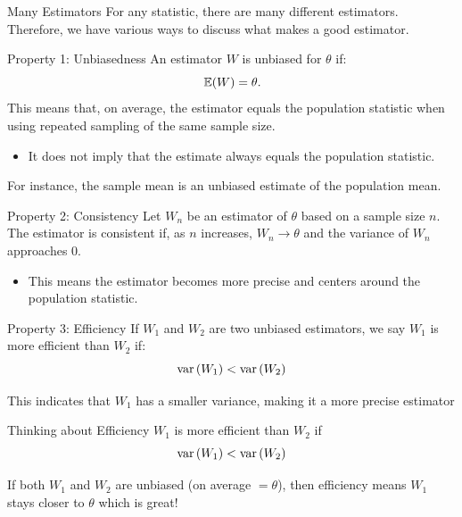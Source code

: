 \documentclass[aspectratio=169,t,11pt,table]{beamer}
\begin{document}
\begin{frame}{Many Estimators}
  For any statistic, there are many different estimators. Therefore, we have various ways to discuss what makes a good estimator.
\end{frame}

\begin{frame}{Property 1: Unbiasedness}
  An estimator $W$ is \alert{unbiased} for $\theta$ if:
  $$
    \expec{W} = \theta.
  $$
  \bigskip
  This means that, on average, the estimator equals the population statistic when using repeated sampling of the same sample size.  
  \begin{itemize}
    \item It does not imply that the estimate always equals the population statistic.
  \end{itemize}
  
  \pause
  \bigskip
  For instance, the sample mean is an unbiased estimate of the population mean.
\end{frame}

\begin{frame}{Property 2: Consistency}
  Let $W_n$ be an estimator of $\theta$ based on a sample size $n$. The estimator is \alert{consistent} if, as $n$ increases, $W_n \to \theta$ and the variance of $W_n$ approaches 0.  
  
  \pause
  \begin{itemize}
    \item This means the estimator becomes more precise and centers around the population statistic.
  \end{itemize}
\end{frame}

\begin{frame}{Property 3: Efficiency}
  If $W_1$ and $W_2$ are two unbiased estimators, we say $W_1$ is more efficient than $W_2$ if:
  $$
    \var{W_1} < \var{W_2}
  $$
  
  \bigskip
  This indicates that $W_1$ has a smaller variance, making it a more precise estimator
\end{frame}

\begin{frame}{Thinking about Efficiency}
  $W_1$ is more efficient than $W_2$ if
  $$
    \var{W_1} < \var{W_2}
  $$

  \bigskip
  If both $W_1$ and $W_2$ are unbiased (on average $= \theta$), then efficiency means $W_1$ stays closer to $\theta$ which is great!
\end{frame}
\end{document}
